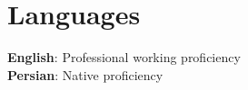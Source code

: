 \section{Languages}
\begin{itemize}[leftmargin=0.15in, label={}]
	\small{\item{
			\textbf{English}{: Professional working proficiency}
			\\
			\textbf{Persian}{: Native proficiency} \\
	}}
\end{itemize}